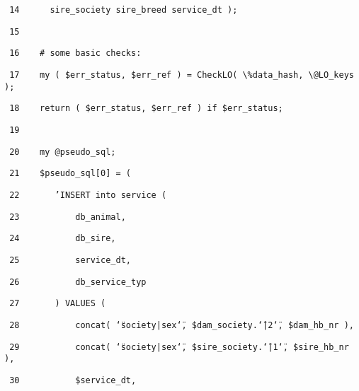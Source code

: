 \begin{table}[htbp]
\texttt{\small ~14~~~~~ sire\_society sire\_breed service\_dt
);}{\small \par}

\texttt{\small ~15 }{\small \par}

\texttt{\small ~16~~~ \# some basic checks:}{\small \par}

\texttt{\small ~17~~~ my ( \$err\_status, \$err\_ref ) = CheckLO(
\textbackslash{}\%data\_hash, \textbackslash{}@LO\_keys );}{\small \par}

\texttt{\small ~18~~~ return ( \$err\_status, \$err\_ref ) if
\$err\_status;}{\small \par}

\texttt{\small ~19 }{\small \par}

\texttt{\small ~20~~~ my @pseudo\_sql;}{\small \par}

\texttt{\small ~21~~~ \$pseudo\_sql{[}0{]} = (}{\small \par}

\texttt{\small ~22~~~~~~ 'INSERT into service (}{\small \par}

\texttt{\small ~23~~~~~~~~~~ db\_animal,}{\small \par}

\texttt{\small ~24~~~~~~~~~~ db\_sire,}{\small \par}

\texttt{\small ~25~~~~~~~~~~ service\_dt,}{\small \par}

\texttt{\small ~26~~~~~~~~~~ db\_service\_typ}{\small \par}

\texttt{\small ~27~~~~~~ ) VALUES (}{\small \par}

\texttt{\small ~28~~~~~~~~~~ concat( \char`\"{}society|sex\char`\"{},
\$dam\_society.\char`\"{}|2\char`\"{}, \$dam\_hb\_nr ),}{\small \par}

\texttt{\small ~29~~~~~~~~~~ concat( \char`\"{}society|sex\char`\"{},
\$sire\_society.\char`\"{}|1\char`\"{}, \$sire\_hb\_nr ),}{\small \par}

\texttt{\small ~30~~~~~~~~~~ \$service\_dt,}{\small \par}


\end{table}

